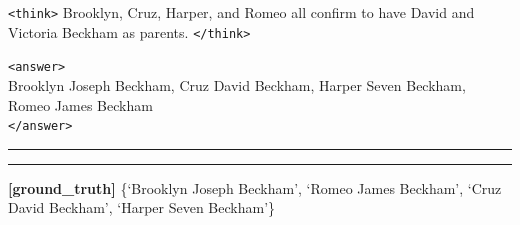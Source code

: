 \begin{table}[H]
\begin{reasonbox}[title=\framework{} Response Example — \dataset{WebQSP}]
\texttt{<think>} Brooklyn, Cruz, Harper, and Romeo all confirm to have David and Victoria Beckham as parents. \texttt{</think>}

\begin{blueblock}
\texttt{<answer>}\\
Brooklyn Joseph Beckham, Cruz David Beckham, Harper Seven Beckham, Romeo James Beckham\\
\texttt{</answer>}
\end{blueblock}

\vspace{0.5em}\hrule\vspace{0.5em}
\vspace{0.1em}\hrule\vspace{0.5em}
\textbf{[ground\_truth]} \{‘Brooklyn Joseph Beckham’, ‘Romeo James Beckham’, ‘Cruz David Beckham’, ‘Harper Seven Beckham’\}
\end{reasonbox}
\end{table}






